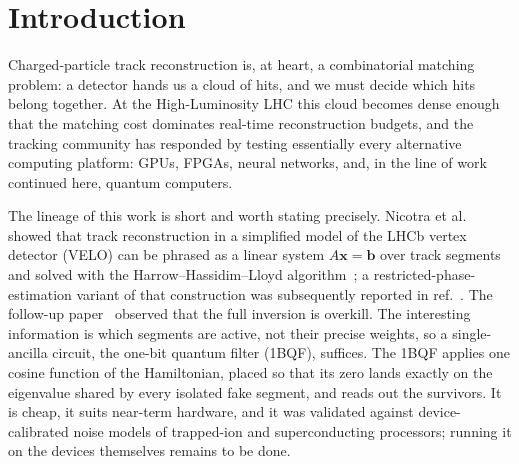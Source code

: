 \documentclass[11pt,a4paper]{article}
\begin{document}
\begin{abstract}
inherited from the classical literature can only be judged together with
the response applied to them. The Denby--Peterson occupancy term destroys
the one-bit filter, whose single zero cannot follow the spectrum it
creates; but paired with a response refitted to that spectrum it becomes
the strongest configuration in the study: at the matched $99\%$-efficiency
point ($T{=}200$) it cuts the false rate thirtyfold at moderate noise
($0.31$ to $0.010$), and at heavy noise by a fifth to a half --- both
figures depend on the polynomial degree, the moderate one reading
seventeenfold at degree $40$ against thirtyfold at degree $80$ --- and,
at small coupling, it breaks the twin degeneracy that sets the ceiling,
which is therefore a property of the base Hamiltonian and not of the
problem. The bifurcation (fork) term is likewise a regression under the
clean-event comb applied without refitting, and likewise a win once the
response is refit to the spectrum it creates, but lower on the
efficiency axis: below the ceiling it wins, and at the strict $99\%$
point both systems flood alike. The result is a two-part
design rule: the operator shapes the spectrum, and the fitted response
separates it; neither knob can be evaluated without the other.
\end{abstract}

\tableofcontents
\section{Introduction}
\label{sec:intro}

Charged-particle track reconstruction is, at heart, a combinatorial
matching problem: a detector hands us a cloud of hits, and we must decide
which hits belong together. At the High-Luminosity LHC this cloud becomes
dense enough that the matching cost dominates real-time reconstruction
budgets, and the tracking community has responded by testing essentially
every alternative computing platform: GPUs, FPGAs, neural networks, and, in
the line of work continued here, quantum computers.

The lineage of this work is short and worth stating precisely. Nicotra et
al.~\cite{nicotra2023} showed that track reconstruction in a simplified
model of the LHCb vertex detector (VELO) can be phrased as a linear system
$A\mathbf{x}=\mathbf{b}$ over track segments and solved with the
Harrow--Hassidim--Lloyd algorithm~\cite{hhl2009}; a restricted-phase-estimation
variant of that construction was subsequently reported in
ref.~\cite{trackhhl_epj}. The follow-up
paper~\cite{trackhhl} observed that the full inversion is overkill. The
interesting information is which segments are active, not their precise
weights, so a single-ancilla circuit, the one-bit quantum filter (1BQF),
suffices. The 1BQF applies one cosine function of the Hamiltonian, placed
so that its zero lands exactly on the eigenvalue shared by every isolated
fake segment, and reads out the survivors. It is cheap, it suits near-term
hardware, and it was validated against device-calibrated noise models
of trapped-ion and superconducting processors; running it on the
devices themselves remains to be done.
\end{document}
